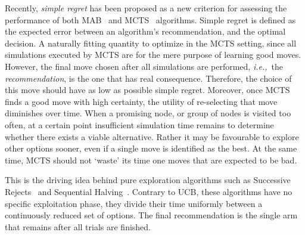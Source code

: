 \documentclass{kecsmstr}
\newcommand{\ie}{{\it i.e.,}~}
\begin{document}
Recently, \emph{simple regret} has been proposed as a new criterion for assessing the performance of both MAB~ and MCTS~ algorithms. Simple regret is defined as the expected error between an algorithm's recommendation, and the optimal decision. A naturally fitting quantity to optimize in the MCTS setting, since all simulations executed by MCTS are for the mere purpose of learning good moves. However, the final move chosen after all simulations are performed, \ie the \emph{recommendation}, is the one that has real consequence. Therefore, the choice of this move should have as low as possible simple regret. Moreover, once MCTS finds a good move with high certainty, the utility of re-selecting that move diminishes over time. When a promising node, or group of nodes is visited too often, at a certain point insufficient simulation time remains to determine whether there exists a viable alternative. Rather it may be favourable to explore other options sooner, even if a single move is identified as the best. At the same time, MCTS should not `waste' its time one moves that are expected to be bad.

This is the driving idea behind pure exploration algorithms such as Successive Rejects~ and Sequential Halving~. Contrary to UCB, these algorithms have no specific exploitation phase, they divide their time uniformly between a continuously reduced set of options. The final recommendation is the single arm that remains after all trials are finished.
\newpage
\end{document}
